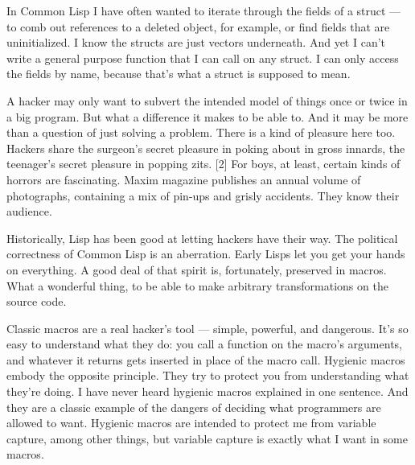In Common Lisp I have often
                  wanted to iterate through the fields of a struct --- to
                  comb out references to a deleted object, for example, or find
                  fields that are uninitialized. I know the structs are just
                  vectors underneath. And yet I can't write a general purpose
                  function that I can call on any struct. I can only access the
                  fields by name, because that's what a struct is supposed to
                  mean.

A hacker may only want to subvert the
                  intended model of things once or twice in a big program. But
                  what a difference it makes to be able to. And it may be more
                  than a question of just solving a problem. There is a kind of
                  pleasure here too. Hackers share the surgeon's secret pleasure
                  in poking about in gross innards, the teenager's secret
                  pleasure in popping zits. [2] For boys, at least, certain
                  kinds of horrors are fascinating. Maxim magazine publishes an
                  annual volume of photographs, containing a mix of pin-ups and
                  grisly accidents. They know their audience.

Historically,
                  Lisp has been good at letting hackers have their way. The
                  political correctness of Common Lisp is an aberration. Early
                  Lisps let you get your hands on everything. A good deal of
                  that spirit is, fortunately, preserved in macros. What a
                  wonderful thing, to be able to make arbitrary transformations
                  on the source code.

Classic macros are a real
                  hacker's tool --- simple, powerful, and dangerous. It's so
                  easy to understand what they do: you call a function on the
                  macro's arguments, and whatever it returns gets inserted in
                  place of the macro call. Hygienic macros embody the opposite
                  principle. They try to protect you from understanding what
                  they're doing. I have never heard hygienic macros explained in
                  one sentence. And they are a classic example of the dangers of
                  deciding what programmers are allowed to want. Hygienic macros
                  are intended to protect me from variable capture, among other
                  things, but variable capture is exactly what I want in some
                  macros.

